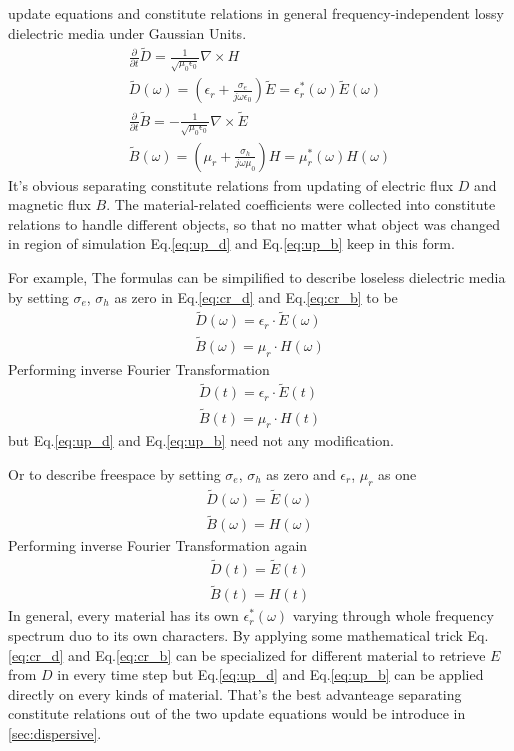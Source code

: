 update equations and constitute relations in general frequency-independent lossy dielectric media under Gaussian Units.
\begin{gather}
  \frac{\partial}{\partial t}\widetilde{D} = \frac{1}{\sqrt{\mu_0\epsilon_0}}\nabla\times H\label{eq:up_d}\\
  \widetilde{D}(\omega) = \left(\epsilon_r + \frac{\sigma_e}{j\omega\epsilon_0}\right)\widetilde{E} = \epsilon_r^*(\omega)\widetilde{E}(\omega)\label{eq:cr_d}\\
  \frac{\partial}{\partial t}\widetilde{B} = -\frac{1}{\sqrt{\mu_0\epsilon_0}}\nabla\times\widetilde{E}\label{eq:up_b}\\
  \widetilde{B}(\omega) = \left(\mu_r + \frac{\sigma_h}{j\omega\mu_0}\right)H = \mu_r^*(\omega)H(\omega)\label{eq:cr_b}
\end{gather}
It's obvious separating constitute relations from updating of electric flux $D$ and magnetic flux $B$. The
material-related coefficients were collected into constitute relations to handle different objects, so that no matter
what object was changed in region of simulation Eq.\ref{eq:up_d} and Eq.\ref{eq:up_b} keep in this form.

For example, The formulas can be simpilified to describe loseless dielectric media by setting $\sigma_e$, $\sigma_h$ as
zero in Eq.\ref{eq:cr_d} and Eq.\ref{eq:cr_b} to be
\begin{gather*}
  \widetilde{D}(\omega) = \epsilon_r\cdot\widetilde{E}(\omega)\\
  \widetilde{B}(\omega) = \mu_r\cdot H(\omega)
\end{gather*}
Performing inverse Fourier Transformation
\begin{gather*}
  \widetilde{D}(t) = \epsilon_r\cdot\widetilde{E}(t)\\
  \widetilde{B}(t) = \mu_r\cdot H(t)
\end{gather*}
but Eq.\ref{eq:up_d} and Eq.\ref{eq:up_b} need not any modification.

Or to describe freespace by setting $\sigma_e$, $\sigma_h$ as zero and $\epsilon_r$, $\mu_r$ as one 
\begin{gather*}
  \widetilde{D}(\omega) = \widetilde{E}(\omega)\\
  \widetilde{B}(\omega) = H(\omega)
\end{gather*}
Performing inverse Fourier Transformation again
\begin{gather*}
  \widetilde{D}(t) = \widetilde{E}(t)\\
  \widetilde{B}(t) = H(t)
\end{gather*}
In general, every material has its own $\epsilon_r^*(\omega)$ varying through whole frequency spectrum duo to its own
characters. By applying some mathematical trick Eq.\ref{eq:cr_d} and Eq.\ref{eq:cr_b} can be specialized for different
material to retrieve $E$ from $D$ in every time step but Eq.\ref{eq:up_d} and Eq.\ref{eq:up_b} can be applied directly
on every kinds of material. That's the best advanteage separating constitute relations out of the two update equations
would be introduce in \ref{sec:dispersive}.

